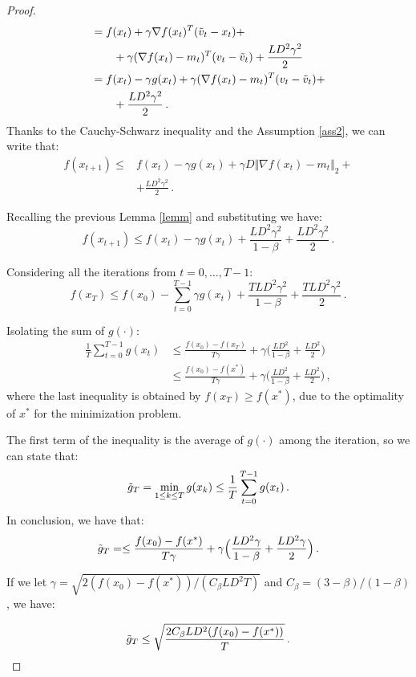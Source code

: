 \documentclass[10pt,twocolumn,letterpaper, english]{article}
\theoremstyle{definition}
\theoremstyle{plain}
\theoremstyle{plain}
\theoremstyle{plain}
\theoremstyle{plain}
\theoremstyle{remark}
\theoremstyle{remark}
\theoremstyle{definition}
\theoremstyle{definition}
\theoremstyle{definition}
\theoremstyle{definition}
\begin{document}
\begin{proof}
\begin{align*}
    & = f(x_t) + \gamma \nabla f(x_t)^T (\Tilde{v}_t - x_t) + \\
    &\qquad+ \gamma (\nabla f(x_t) - m_t)^T (v_t - \Tilde{v}_t) + \frac{L D^2 \gamma^2}{2}\\
    &= f(x_t) - \gamma g(x_t) + \gamma (\nabla f(x_t) - m_t)^T (v_t - \Tilde{v}_t) + \\
    &\qquad +\frac{L D^2 \gamma^2}{2}\,.
\end{align*}
Thanks to the Cauchy-Schwarz inequality and the Assumption \ref{ass2}, we can write that: 
\begin{align*}
    f(x_{t+1}) \le  &f(x_t) - \gamma g(x_t) + \gamma D \Vert \nabla f(x_t) - m_t \Vert_2 + \\
    &+\frac{L D^2 \gamma^2}{2}\,.
\end{align*}

Recalling the previous Lemma \ref{lemm} and substituting we have:
\begin{equation*}
    f(x_{t+1}) \le f(x_t) - \gamma g(x_t) + \frac{L D^2 \gamma^2}{1 - \beta} + \frac{L D^2 \gamma^2}{2}\,.
\end{equation*}

Considering all the iterations from $t=0, \dots, T-1$:
\begin{equation*}
    f(x_{T}) \le f(x_0) - \sum_{t=0}^{T-1} \gamma g(x_t) + \frac{T L D^2 \gamma^2}{1 - \beta} + \frac{T L D^2 \gamma^2}{2}\,.
\end{equation*}

Isolating the sum of $g(\cdot)$:
\begin{align*}
    \frac{1}{T}\sum_{t=0}^{T-1} g(x_t) & \le \frac{f(x_0)-f(x_T)}{T\gamma} + \gamma \Big(\frac{ L D^2 }{1 - \beta} + \frac{ L D^2 }{2}\Big)\\
    & \le \frac{f(x_0)-f(x^\ast)}{T\gamma} + \gamma \Big(\frac{ L D^2 }{1 - \beta} + \frac{ L D^2 }{2}\Big)\,,
\end{align*}
where the last inequality is obtained by $f(x_T) \ge f(x^\ast)$, due to the optimality of $x^*$ for the minimization problem.

The first term of the inequality is the average of $g(\cdot)$ among the iteration, so we can state that:
\begin{equation*}
    \Tilde{g}_T= \min_{1 \le k \le T}g(x_k) \le \frac{1}{T}\sum_{t=0}^{T-1} g(x_t)\,.
\end{equation*}
In conclusion, we have that:
\begin{equation*}
    \Tilde{g}_T= \le \frac{f(x_0)-f(x^\ast)}{T\gamma} + \gamma \Big(\frac{ L D^2 \gamma}{1 - \beta} + \frac{ L D^2 \gamma}{2} \Big)\,.
\end{equation*}

If we let $ \gamma= \sqrt{2(f(x_0)- f(x^\ast))/(C_\beta L D^2 T )}$ and $C_{\beta}=(3-\beta)/(1-\beta)$, we have:

\begin{equation*}
    \Tilde{g}_T \le \sqrt{ \frac{2C_\beta L D^2 (f(x_0)- f(x^\ast))}{T}}\,.
\end{equation*}

\end{proof}
\end{document}
